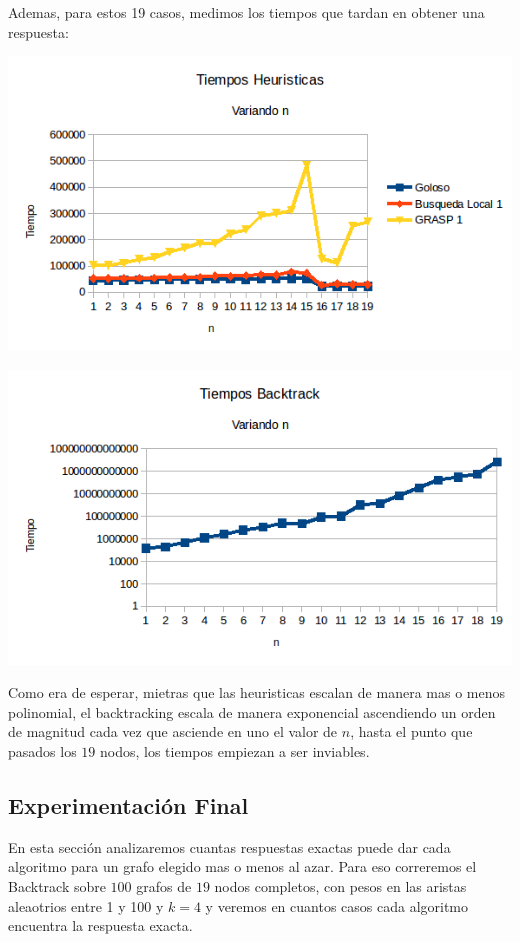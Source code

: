 Ademas, para estos 19 casos, medimos los tiempos que tardan en obtener una respuesta:

\includegraphics[scale=0.5]{Con/tiempos1Back.png}

\includegraphics[scale=0.5]{Con/tiempos1Otros.png}

Como era de esperar, mietras que las heuristicas escalan de manera mas o menos polinomial, el backtracking escala de manera exponencial ascendiendo un orden de magnitud cada vez que asciende en uno el valor de $n$, hasta el punto que pasados los $19$ nodos, los tiempos empiezan a ser inviables.

\subsection{Experimentación Final}

En esta sección analizaremos cuantas respuestas exactas puede dar cada algoritmo para un grafo elegido mas o menos al azar. Para eso correremos el Backtrack sobre $100$ grafos de $19$ nodos completos, con pesos en las aristas aleaotrios entre 1 y 100 y $k = 4$ y veremos en cuantos casos cada algoritmo encuentra la respuesta exacta.

